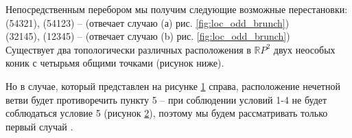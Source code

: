 \documentclass[14pt]{article}
\begin{document}
Непосредственным перебором мы получим следующие возможные перестановки:\\
(54321), (54123) – (отвечает случаю (а) рис. \ref{fig:loc_odd_brunch})\\ 
(32145), (12345) – (отвечает случаю (b) рис. \ref{fig:loc_odd_brunch})\\

Существует два топологически различных расположения в $\mathbb RP^2$ двух неособых коник с четырьмя общими точками (рисунок ниже).

\begin{figure}[H]
\caption{}
\label{fig:intersection_of_ovals}
\end{figure}

Но в случае, который представлен на рисунке \ref{fig:intersection_of_ovals} справа, расположение нечетной ветви будет противоречить пункту 5 -- при соблюдении условий 1-4 не будет соблюдаться условие 5 (рисунок \ref{fig:prohibit_second_inters_ovals}),  поэтому мы будем рассматривать только первый случай .

\begin{figure}[H]
\caption{}
\label{fig:prohibit_second_inters_ovals}
\end{figure}
\end{document}
